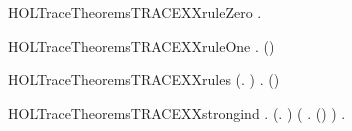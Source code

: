 \begin{SaveVerbatim}{HOLTraceTheoremsTRACEXXruleZero}
\HOLTokenTurnstile{} \HOLSymConst{\HOLTokenForall{}}.   \HOLConst{\ensuremath{\epsilon}} 
\end{SaveVerbatim}
\newcommand{\HOLTraceTheoremsTRACEXXruleZero}{\UseVerbatim{HOLTraceTheoremsTRACEXXruleZero}}
\begin{SaveVerbatim}{HOLTraceTheoremsTRACEXXruleOne}
\HOLTokenTurnstile{} \HOLSymConst{\HOLTokenForall{}}    .  \HOLTokenTransBegin{}\HOLTokenTransEnd {} \HOLSymConst{\HOLTokenConj{}}     \HOLSymConst{\HOLTokenImp{}}   (\HOLSymConst{::}) 
\end{SaveVerbatim}
\newcommand{\HOLTraceTheoremsTRACEXXruleOne}{\UseVerbatim{HOLTraceTheoremsTRACEXXruleOne}}
\begin{SaveVerbatim}{HOLTraceTheoremsTRACEXXrules}
\HOLTokenTurnstile{} (\HOLSymConst{\HOLTokenForall{}}.   \HOLConst{\ensuremath{\epsilon}} ) \HOLSymConst{\HOLTokenConj{}}
   \HOLSymConst{\HOLTokenForall{}}    .  \HOLTokenTransBegin{}\HOLTokenTransEnd {} \HOLSymConst{\HOLTokenConj{}}     \HOLSymConst{\HOLTokenImp{}}   (\HOLSymConst{::}) 
\end{SaveVerbatim}
\newcommand{\HOLTraceTheoremsTRACEXXrules}{\UseVerbatim{HOLTraceTheoremsTRACEXXrules}}
\begin{SaveVerbatim}{HOLTraceTheoremsTRACEXXstrongind}
\HOLTokenTurnstile{} \HOLSymConst{\HOLTokenForall{}}.
       (\HOLSymConst{\HOLTokenForall{}}.   \HOLConst{\ensuremath{\epsilon}} ) \HOLSymConst{\HOLTokenConj{}}
       (\HOLSymConst{\HOLTokenForall{}}    .
             \HOLTokenTransBegin{}\HOLTokenTransEnd {} \HOLSymConst{\HOLTokenConj{}}     \HOLSymConst{\HOLTokenConj{}}     \HOLSymConst{\HOLTokenImp{}}   (\HOLSymConst{::}) ) \HOLSymConst{\HOLTokenImp{}}
       \HOLSymConst{\HOLTokenForall{}}  .     \HOLSymConst{\HOLTokenImp{}}    
\end{SaveVerbatim}
